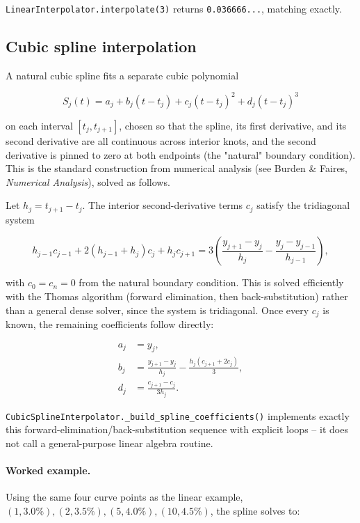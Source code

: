 \documentclass[11pt]{article}
\begin{document}
\texttt{LinearInterpolator.interpolate(3)} returns \texttt{0.036666...}, matching exactly.

\subsection{Cubic spline interpolation}

A natural cubic spline fits a separate cubic polynomial

\begin{equation}
  S_j(t) = a_j + b_j(t-t_j) + c_j(t-t_j)^2 + d_j(t-t_j)^3
\end{equation}

on each interval $[t_j, t_{j+1}]$, chosen so that the spline, its first derivative, and its
second derivative are all continuous across interior knots, and the second derivative is
pinned to zero at both endpoints (the "natural" boundary condition). This is the standard
construction from numerical analysis (see Burden \& Faires, \emph{Numerical Analysis}), solved
as follows.

Let $h_j = t_{j+1} - t_j$. The interior second-derivative terms $c_j$ satisfy the tridiagonal
system

\begin{equation}
  h_{j-1} c_{j-1} + 2(h_{j-1}+h_j) c_j + h_j c_{j+1} = 3\left(\frac{y_{j+1}-y_j}{h_j} - \frac{y_j - y_{j-1}}{h_{j-1}}\right),
  \label{eq:spline-tridiag}
\end{equation}

with $c_0 = c_n = 0$ from the natural boundary condition. This is solved efficiently with the
Thomas algorithm (forward elimination, then back-substitution) rather than a general dense
solver, since the system is tridiagonal. Once every $c_j$ is known, the remaining coefficients
follow directly:

\begin{align}
  a_j &= y_j, \\
  b_j &= \frac{y_{j+1}-y_j}{h_j} - \frac{h_j(c_{j+1}+2c_j)}{3}, \\
  d_j &= \frac{c_{j+1}-c_j}{3h_j}.
\end{align}

\texttt{CubicSplineInterpolator.\_build\_spline\_coefficients()} implements exactly this
forward-elimination/back-substitution sequence with explicit loops -- it does not call a
general-purpose linear algebra routine.

\paragraph{Worked example.} Using the same four curve points as the linear example, $(1,
3.0\%), (2, 3.5\%), (5, 4.0\%), (10, 4.5\%)$, the spline solves to:
\end{document}
